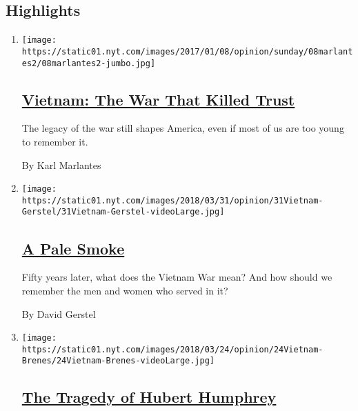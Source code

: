 \hypertarget{highlights}{%
\subsection{Highlights}\label{highlights}}

\begin{enumerate}
\def\labelenumi{\arabic{enumi}.}
\item
  \texttt{[image: https://static01.nyt.com/images/2017/01/08/opinion/sunday/08marlantes2/08marlantes2-jumbo.jpg]}

  \hypertarget{vietnam-the-war-that-killed-trust}{%
  \subsection{\texorpdfstring{\href{/2017/01/07/opinion/sunday/vietnam-the-war-that-killed-trust.html}{Vietnam:
  The War That Killed
  Trust}}{Vietnam: The War That Killed Trust}}\label{vietnam-the-war-that-killed-trust}}

  The legacy of the war still shapes America, even if most of us are too
  young to remember it.

  By Karl Marlantes
\item
  \texttt{[image: https://static01.nyt.com/images/2018/03/31/opinion/31Vietnam-Gerstel/31Vietnam-Gerstel-videoLarge.jpg]}

  \hypertarget{a-pale-smoke}{%
  \subsection{\texorpdfstring{\href{/2018/03/30/opinion/vietnam-fifty-years-later.html}{A
  Pale Smoke}}{A Pale Smoke}}\label{a-pale-smoke}}

  Fifty years later, what does the Vietnam War mean? And how should we
  remember the men and women who served in it?

  By David Gerstel
\item
  \texttt{[image: https://static01.nyt.com/images/2018/03/24/opinion/24Vietnam-Brenes/24Vietnam-Brenes-videoLarge.jpg]}

  \hypertarget{the-tragedy-of-hubert-humphrey}{%
  \subsection{\texorpdfstring{\href{/2018/03/23/opinion/vietnam-hubert-humphrey.html}{The
  Tragedy of Hubert
  Humphrey}}{The Tragedy of Hubert Humphrey}}\label{the-tragedy-of-hubert-humphrey}}


\end{enumerate}
